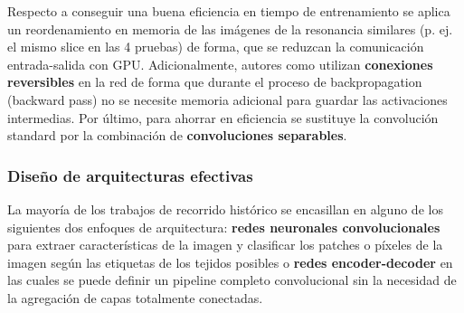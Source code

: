 			Respecto a conseguir una buena eficiencia en tiempo de entrenamiento se aplica un reordenamiento en memoria de las imágenes de la resonancia similares (p. ej. el mismo slice en las 4 pruebas) de forma, que se reduzcan la comunicación entrada-salida con GPU. Adicionalmente, autores como \cite{brugger2019partially} utilizan \textbf{conexiones reversibles}  en la red de forma que durante el proceso de backpropagation (backward pass) no se necesite memoria adicional para guardar las activaciones intermedias. Por último, para ahorrar en eficiencia se sustituye la convolución standard por la combinación de \textbf{convoluciones separables}.
			
			\subsubsection{Diseño de arquitecturas efectivas}
			
			La mayoría de los trabajos de recorrido histórico se encasillan en alguno de los siguientes dos enfoques de arquitectura: \textbf{redes neuronales convolucionales} para extraer características de la imagen y clasificar los patches o píxeles de la imagen según las etiquetas de los tejidos posibles o \textbf{redes encoder-decoder} en las cuales se puede definir un pipeline completo convolucional sin la necesidad de la agregación de capas totalmente conectadas.
			
